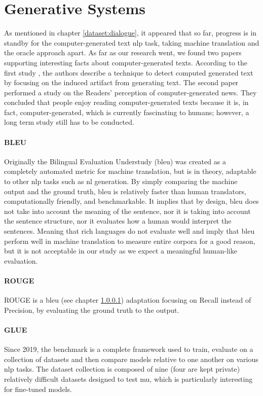 \section{Generative Systems}
As mentioned in chapter \ref{dataset:dialogue}, it appeared that so far, progress is in standby for the computer-generated text \gls{nlp} task, taking machine translation and the \gls{oracle} approach apart. As far as our research went, we found two papers supporting interesting facts about computer-generated texts. According to the first study \autocite{paper:journals/corr/abs-1906-04043}, the authors describe a technique to detect computed generated text by focusing on the induced artifact from generating text. The second paper \autocite{paper:10.1177/1464884916641269} performed a study on the Readers’ perception of computer-generated news. They concluded that people enjoy reading computer-generated texts because it is, in fact, computer-generated, which is currently fascinating to humans; however, a long term study still has to be conducted.

\paragraph{BLEU}
\label{eval:bleu}
Originally the Bilingual Evaluation Understudy (\gls{bleu}) was created as a completely automated metric for machine translation, but is in theory, adaptable to other \gls{nlp} tasks such as \gls{nl} generation. By simply comparing the machine output and the ground truth, \gls{bleu} is relatively faster than human translators, computationally friendly, and benchmarkable. It implies that by design, \gls{bleu} does not take into account the meaning of the sentence, nor it is taking into account the sentence structure, nor it evaluates how a human would interpret the sentences. Meaning that rich languages do not evaluate well and imply that \gls{bleu} perform well in machine translation to measure entire corpora for a good reason, but it is not acceptable in our study as we expect a meaningful human-like evaluation.

\paragraph{ROUGE}
ROUGE is a \gls{bleu} (see chapter \ref{eval:bleu}) adaptation focusing on Recall instead of Precision, by evaluating the ground truth to the output.

\paragraph{GLUE}
Since 2019, the  benchmark is a complete framework used to train, evaluate on a collection of datasets and then compare models relative to one another on various \gls{nlp} tasks. The dataset collection is composed of nine (four are kept private) relatively difficult datasets designed to test \gls{mu}, which is particularly interesting for fine-tuned models.

